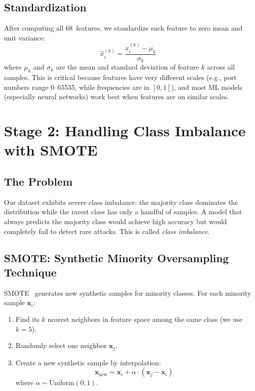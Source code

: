 \documentclass[conference]{IEEEtran}
\newcommand{\vect}[1]{\bm{#1}}
\begin{document}
\subsection{Standardization}

After computing all 68~features, we standardize each feature to zero mean and unit variance:
\begin{equation}
    \hat{x}^{(k)}_i = \frac{x^{(k)}_i - \mu_k}{\sigma_k}
\end{equation}
where $\mu_k$ and $\sigma_k$ are the mean and standard deviation of feature $k$ across all samples. This is critical because features have very different scales (e.g., port numbers range 0--65535, while frequencies are in $[0,1]$), and most ML models (especially neural networks) work best when features are on similar scales.

\section{Stage 2: Handling Class Imbalance with SMOTE}
\label{sec:smote}

\subsection{The Problem}

Our dataset exhibits severe class imbalance: the majority class dominates the distribution while the rarest class has only a handful of samples. A model that always predicts the majority class would achieve high accuracy but would completely fail to detect rare attacks. This is called \emph{class imbalance}.

\subsection{SMOTE: Synthetic Minority Oversampling Technique}

SMOTE~\cite{chawla2002smote} generates new synthetic samples for minority classes. For each minority sample $\vect{x}_i$:

\begin{enumerate}
    \item Find its $k$ nearest neighbors in feature space among the same class (we use $k=5$).
    \item Randomly select one neighbor $\vect{x}_j$.
    \item Create a new synthetic sample by interpolation:
    \begin{equation}
        \vect{x}_{\text{new}} = \vect{x}_i + \alpha \cdot (\vect{x}_j - \vect{x}_i)
    \end{equation}
    where $\alpha \sim \text{Uniform}(0, 1)$.
\end{enumerate}
\end{document}
